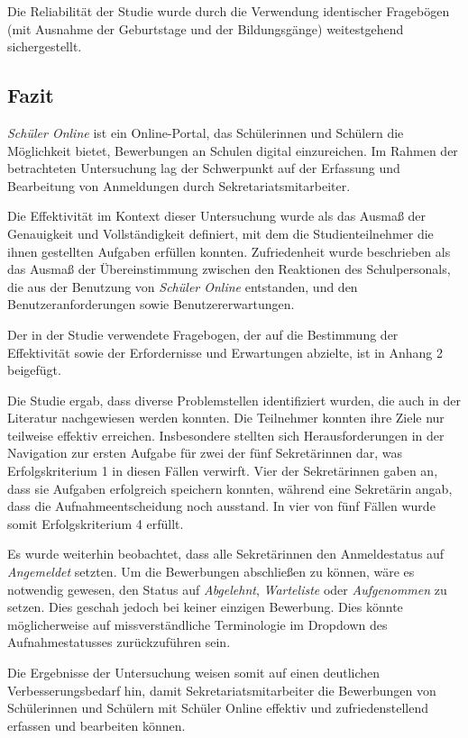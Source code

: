 Die Reliabilität der Studie wurde durch die Verwendung identischer Fragebögen (mit Ausnahme der Geburtstage und der Bildungsgänge) weitestgehend sichergestellt.

\subsection{Fazit}

\textit{Schüler Online} ist ein Online-Portal, das Schülerinnen und Schülern die Möglichkeit bietet, Bewerbungen an Schulen digital einzureichen. Im Rahmen der betrachteten Untersuchung lag der Schwerpunkt auf der Erfassung und Bearbeitung von Anmeldungen durch Sekretariatsmitarbeiter.

Die Effektivität im Kontext dieser Untersuchung wurde als das Ausmaß der Genauigkeit und Vollständigkeit definiert, mit dem die Studienteilnehmer die ihnen gestellten Aufgaben erfüllen konnten. Zufriedenheit wurde beschrieben als das Ausmaß der Übereinstimmung zwischen den Reaktionen des Schulpersonals, die aus der Benutzung von \textit{Schüler Online} entstanden, und den Benutzeranforderungen sowie Benutzererwartungen.

Der in der Studie verwendete Fragebogen, der auf die Bestimmung der Effektivität sowie der Erfordernisse und Erwartungen abzielte, ist in Anhang 2 beigefügt.

Die Studie ergab, dass diverse Problemstellen identifiziert wurden, die auch in der Literatur nachgewiesen werden konnten. Die Teilnehmer konnten ihre Ziele nur teilweise effektiv erreichen. Insbesondere stellten sich Herausforderungen in der Navigation zur ersten Aufgabe für zwei der fünf Sekretärinnen dar, was Erfolgskriterium 1 in diesen Fällen verwirft. Vier der Sekretärinnen gaben an, dass sie Aufgaben erfolgreich speichern konnten, während eine Sekretärin angab, dass die Aufnahmeentscheidung noch ausstand. In vier von fünf Fällen wurde somit Erfolgskriterium 4 erfüllt.

Es wurde weiterhin beobachtet, dass alle Sekretärinnen den Anmeldestatus auf \textit{Angemeldet} setzten. Um die Bewerbungen abschließen zu können, wäre es notwendig gewesen, den Status auf \textit{Abgelehnt}, \textit{Warteliste} oder \textit{Aufgenommen} zu setzen. Dies geschah jedoch bei keiner einzigen Bewerbung. Dies könnte möglicherweise auf missverständliche Terminologie im Dropdown des Aufnahmestatusses zurückzuführen sein. 

Die Ergebnisse der Untersuchung weisen somit auf einen deutlichen Verbesserungsbedarf hin, damit Sekretariatsmitarbeiter die Bewerbungen von Schülerinnen und Schülern mit Schüler Online effektiv und zufriedenstellend erfassen und bearbeiten können.

